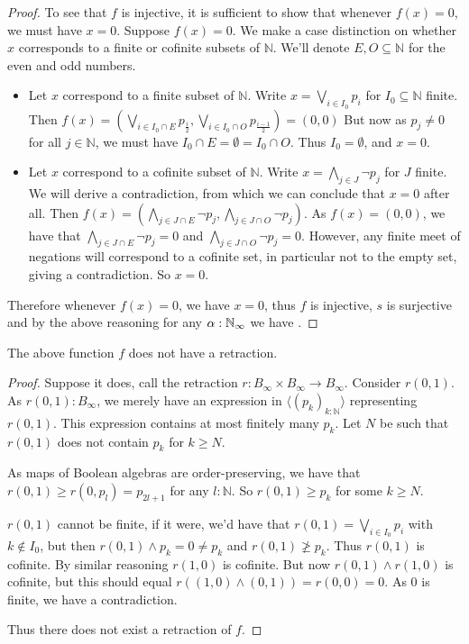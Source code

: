 \documentclass{../util/zariski-small}
\begin{document}
\begin{proof}
  To see that $f$ is injective, it is sufficient to show that whenever $f(x) = 0$, we must have $x = 0$. 
  Suppose $f(x) = 0$. %
  We make a case distinction on whether $x$ corresponds
  to a finite or cofinite subsets of $\mathbb N$. 
  We'll denote $E,O\subseteq \mathbb N$ for the even and odd numbers.
  \begin{itemize}
    \item Let $x$ correspond to a finite subset of $\mathbb N$. Write 
      $x = \bigvee_{i\in I_0} p_i$ for $I_0\subseteq \mathbb N$ finite. 
      Then $f(x) = (\bigvee_{i\in I_0 \cap E } p_{\frac i2} , \bigvee_{i\in I_0 \cap O } p_{\frac {i-1}2} ) = (0,0)$
      But now as $p_j\neq 0$ for all $j\in\mathbb N$, we must have $I_0 \cap E = \emptyset = I_0 \cap O$. 
      Thus $I_0= \emptyset$, and $x = 0$. 
    \item Let $x$ correspond to a cofinite subset of $\mathbb N$. Write 
      $x = \bigwedge_{j\in J} \neg p_j$ for $J$ finite. 
      We will derive a contradiction, from which we can conclude that $x=0$ after all. 
      Then $f(x) = (\bigwedge_{j\in J \cap E } \neg p_j , \bigwedge_{j\in J \cap O } \neg p_j )$. 
      As $f(x) = (0,0)$, we have that 
      $\bigwedge_{j\in J \cap E } \neg p_j =0$ and
      $\bigwedge_{j\in J \cap O } \neg p_j  = 0$.
      However, any finite meet of negations will correspond to a cofinite set,
      in particular not to the empty set, giving a contradiction. 
      So $x = 0$. 
  \end{itemize}
  Therefore whenever $f(x) = 0$, we have $x = 0$, thus $f$ is injective, $s$ is surjective 
  and by the above reasoning for any $\alpha:\mathbb{N}_{\infty}$ we have . 
\end{proof}
\begin{remark}
  The above function $f$ does not have a retraction. 
\begin{proof}
  Suppose it does, call the retraction $r:B_\infty \times B_\infty \to B_\infty$. 
  Consider $r(0,1)$. 
  As $r(0,1):B_\infty$, we merely have an expression in 
  $\langle (p_k)_{k:\mathbb N}\rangle$ 
  representing $r(0,1)$. This expression contains at most finitely many $p_k$. 
  Let $N$ be such that $r(0,1)$ does not contain $p_k$ for $k \geq N$. 

  As maps of Boolean algebras are order-preserving, we have that 
  $r(0,1) \geq r(0,p_l) = p_{2l+1}$ for any $l:\mathbb N$. 
  So $r(0,1) \geq p_{k}$ for some $k \geq N$. 

  $r(0,1)$ cannot be finite, if it were, we'd have that  
  $r(0,1) = \bigvee_{i\in I_0} p_i$ with $k\notin I_0$, 
  but then $r(0,1) \wedge p_k = 0\neq p_k$ and $r(0,1) \not \geq p_k$.
  Thus $r(0,1)$ is cofinite. 
  By similar reasoning $r(1,0)$ is cofinite. 
  But now $r(0,1) \wedge r(1,0)$ is cofinite, 
  but this should equal $r((1,0)\wedge (0,1)) = r(0,0) = 0$. 
  As $0$ is finite, we have a contradiction. 

  Thus there does not exist a retraction of $f$. 
\end{proof}
\end{remark} 
\end{document}
